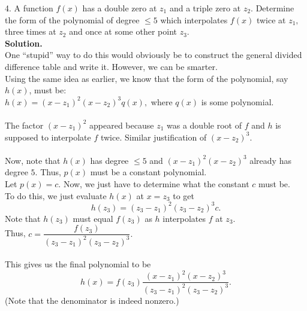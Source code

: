 \documentclass{article}
\begin{document}
\hrulefill

4. A function $f(x)$ has a double zero at $z_1$ and a triple zero at $z_2.$ Determine the form of the polynomial of degree $\le 5$ which interpolates $f(x)$ twice at $z_1,$ three times at $z_2$ and once at some other point $z_3.$\\

\textbf{Solution.}\\
One ``stupid'' way to do this would obviously be to construct the general divided difference table and write it. However, we can be smarter.\\
Using the same idea as earlier, we know that the form of the polynomial, say $h(x)$, must be:\\
$h(x) = (x - z_1)^2(x - z_2)^3q(x),$ where $q(x)$ is some polynomial.\\~\\
The factor $(x - z_1)^2$ appeared because $z_1$ was a double root of $f$ and $h$ is supposed to interpolate $f$ twice. Similar justification of $(x - z_2)^3.$\\~\\
Now, note that $h(x)$ has degree $\le 5$ and $(x - z_1)^2(x - z_2)^3$ already has degree $5.$ Thus, $p(x)$ must be a constant polynomial.\\
Let $p(x) = c.$ Now, we just have to determine what the constant $c$ must be.\\
To do this, we just evaluate $h(x)$ at $x = z_3$ to get
\[h(z_3) = (z_3 - z_1)^2(z_3 - z_2)^3c.\]
Note that $h(z_3)$ must equal $f(z_3)$ as $h$ interpolates $f$ at $z_3.$\\
Thus, $c = \dfrac{f(z_3)}{(z_3 - z_1)^2(z_3 - z_2)^3}.$\\~\\
This gives us the final polynomial to be
\[h(x) = f(z_3)\dfrac{(x - z_1)^2(x - z_2)^3}{(z_3 - z_1)^2(z_3 - z_2)^3}.\]
(Note that the denominator is indeed nonzero.)
\end{document}
